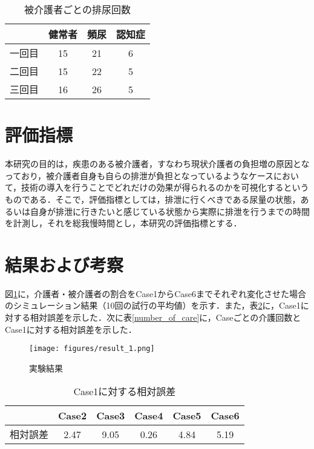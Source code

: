 \begin{table}[htb]
  \caption[被介護者ごとの排尿回数]{被介護者ごとの排尿回数}
  \label{number_of_urination}
  \centering
  \begin{tabular}{r|c|c|c}
     & 健常者 & 頻尿 & 認知症 \\ \hline
    一回目 & 15 & 21 & 6 \\
    二回目 & 15 & 22 & 5 \\
    三回目 & 16 & 26 & 5 \\
    \end{tabular}
\end{table}

\section{評価指標}

本研究の目的は，疾患のある被介護者，すなわち現状介護者の負担増の原因となっており，被介護者自身も自らの排泄が負担となっているようなケースにおいて，技術の導入を行うことでどれだけの効果が得られるのかを可視化するというものである．そこで，評価指標としては，排泄に行くべきである尿量の状態，あるいは自身が排泄に行きたいと感じている状態から実際に排泄を行うまでの時間を計測し，それを総我慢時間とし，本研究の評価指標とする．

\section{結果および考察}

図\ref{result_v1}に，介護者・被介護者の割合をCase1からCase6までそれぞれ変化させた場合のシミュレーション結果（10回の試行の平均値）を示す．また，表\ref{relative_error}に，Case1に対する相対誤差を示した．次に表\ref{number_of_care}に，Caseごとの介護回数とCase1に対する相対誤差を示した．

\begin{figure}[htb]
\begin{center}
 \texttt{[image: figures/result\_1.png]}
 \caption[実験結果]{実験結果 \label{result_v1}}
\end{center}
\end{figure}

\begin{table}[htb]
  \caption[Case1に対する相対誤差]{Case1に対する相対誤差}
  \label{relative_error}
  \centering
  \begin{tabular}{r|c|c|c|c|c}
     & Case2 & Case3 & Case4 & Case5 & Case6 \\ \hline
    相対誤差 & 2.47 & 9.05 & 0.26 & 4.84 & 5.19 \\
    \end{tabular}
\end{table}


